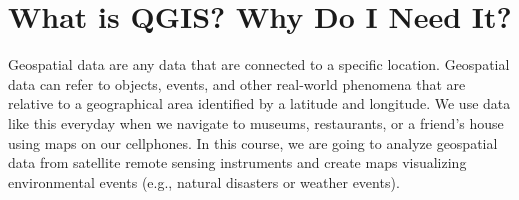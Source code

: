\documentclass[oneside,a4paper,11pt,explicit]{book}
\begin{document}
\fancyhead{}

\section{What is QGIS? Why Do I Need It?}

Geospatial data are any data that are connected to a specific location. Geospatial data can refer to objects, events, and other real-world phenomena that are relative to a geographical area identified by a latitude and longitude. We use data like this everyday when we navigate to museums, restaurants, or a friend's house using maps on our cellphones. In this course, we are going to analyze geospatial data from satellite remote sensing instruments and create maps visualizing environmental events (e.g., natural disasters or weather events). 
\end{document}
